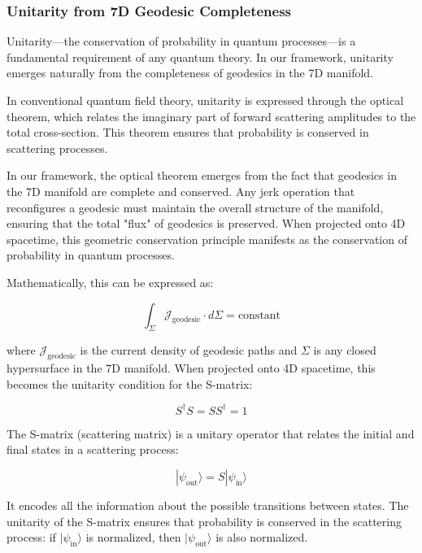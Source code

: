 \documentclass{article}
\begin{document}
\subsubsection{Unitarity from 7D Geodesic Completeness}

Unitarity—the conservation of probability in quantum processes—is a fundamental requirement of any quantum theory. In our framework, unitarity emerges naturally from the completeness of geodesics in the 7D manifold.

In conventional quantum field theory, unitarity is expressed through the optical theorem, which relates the imaginary part of forward scattering amplitudes to the total cross-section. This theorem ensures that probability is conserved in scattering processes.

In our framework, the optical theorem emerges from the fact that geodesics in the 7D manifold are complete and conserved. Any jerk operation that reconfigures a geodesic must maintain the overall structure of the manifold, ensuring that the total "flux" of geodesics is preserved. When projected onto 4D spacetime, this geometric conservation principle manifests as the conservation of probability in quantum processes.

Mathematically, this can be expressed as:

\begin{equation}
\int_{\Sigma} \mathcal{J}_{\text{geodesic}} \cdot d\Sigma = \text{constant}
\end{equation}

where $\mathcal{J}_{\text{geodesic}}$ is the current density of geodesic paths and $\Sigma$ is any closed hypersurface in the 7D manifold. When projected onto 4D spacetime, this becomes the unitarity condition for the S-matrix:

\begin{equation}
S^\dagger S = SS^\dagger = 1
\end{equation}

The S-matrix (scattering matrix) is a unitary operator that relates the initial and final states in a scattering process:

\begin{equation}
|\psi_{\text{out}}\rangle = S|\psi_{\text{in}}\rangle
\end{equation}

It encodes all the information about the possible transitions between states. The unitarity of the S-matrix ensures that probability is conserved in the scattering process: if $|\psi_{\text{in}}\rangle$ is normalized, then $|\psi_{\text{out}}\rangle$ is also normalized.
\end{document}
